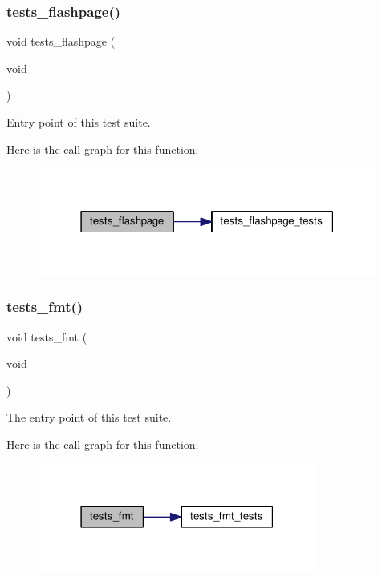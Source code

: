 \subsubsection{\texorpdfstring{tests\+\_\+flashpage()}{tests\_flashpage()}}
{\footnotesize\ttfamily void tests\+\_\+flashpage (\begin{DoxyParamCaption}\item[{void}]{ }\end{DoxyParamCaption})}



Entry point of this test suite. 

Here is the call graph for this function\+:
\nopagebreak
\begin{figure}[H]
\begin{center}
\leavevmode
\includegraphics[width=315pt]{group__unittests_ga4e4d5da67e11b5dccfc097568ed36d82_cgraph}
\end{center}
\end{figure}
\mbox{\label{group__unittests_ga548762e77adf86c79fe9360cee603bbd}} 
\subsubsection{\texorpdfstring{tests\+\_\+fmt()}{tests\_fmt()}}
{\footnotesize\ttfamily void tests\+\_\+fmt (\begin{DoxyParamCaption}\item[{void}]{ }\end{DoxyParamCaption})}



The entry point of this test suite. 

Here is the call graph for this function\+:
\nopagebreak
\begin{figure}[H]
\begin{center}
\leavevmode
\includegraphics[width=259pt]{group__unittests_ga548762e77adf86c79fe9360cee603bbd_cgraph}
\end{center}
\end{figure}
\mbox{\label{group__unittests_gaa26c3c3743ce9c1e363f071dacf5afa0}} 

